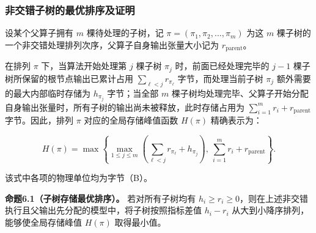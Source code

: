 \documentclass[anonymous,withtoc]{gmcm2026}
\begin{document}
\subsubsection{非交错子树的最优排序及证明}

设某个父算子拥有 \(m\) 棵待处理的子树，记 \(\pi = (\pi_1, \pi_2, \dots, \pi_m)\) 为这 \(m\) 棵子树的一个非交错处理排列次序，父算子自身输出张量大小记为 \(r_{\mathrm{parent}}\)。

在排列 \(\pi\) 下，当算法开始处理第 \(j\) 棵子树 \(\pi_j\) 时，前面已经处理完毕的 \(j - 1\) 棵子树所保留的根节点输出已累计占用 \(\sum_{\ell < j} r_{\pi_\ell}\) 字节，而处理当前子树 \(\pi_j\) 额外需要的最大内部临时存储为 \(h_{\pi_j}\) 字节；当全部 \(m\) 棵子树均处理完毕、父算子开始分配自身输出张量时，所有子树的输出尚未被释放，此时存储占用为 \(\sum_{i=1}^m r_i + r_{\mathrm{parent}}\) 字节。因此，排列 \(\pi\) 对应的全局存储峰值函数 \(H(\pi)\) 精确表示为：

\begin{equation}
H(\pi) = \max \left\{ \max_{1 \le j \le m} \left( \sum_{\ell < j} r_{\pi_\ell} + h_{\pi_j} \right), \ \sum_{i=1}^m r_i + r_{\mathrm{parent}} \right\}.
\end{equation}

该式中各项的物理单位均为字节（B）。

\textbf{命题6.1（子树存储最优排序）。} 若对所有子树均有 \(h_i \ge r_i \ge 0\)，则在上述非交错执行且父输出先分配的模型中，将子树按照指标差值 \(h_i - r_i\) 从大到小降序排列，能够使全局存储峰值 \(H(\pi)\) 取得最小值。
\end{document}
